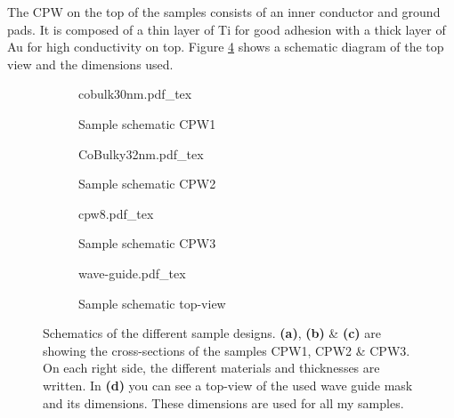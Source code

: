 The CPW on the top of the samples consists of an inner conductor and ground pads. It is composed of a thin layer of Ti for good adhesion with a thick layer of Au for high conductivity on top. Figure \ref{fig:sample_wg} shows a schematic diagram of the top view and the dimensions used.
\begin{figure}
     \centering
     \begin{subfigure}[b]{.45\textwidth}
         \centering
         {cobulk30nm.pdf_tex}
         \caption{Sample schematic CPW1}
         \label{fig:sample_cobulk30nm}
     \end{subfigure}
     \begin{subfigure}[b]{.45\textwidth}
         \centering
         {CoBulky32nm.pdf_tex}
         \caption{Sample schematic CPW2}
         \label{fig:sample_cobulky32nm}
     \end{subfigure}
     \begin{subfigure}[b]{.45\textwidth}
         \centering
         {cpw8.pdf_tex}
         \caption{Sample schematic CPW3}
         \label{fig:sample_cpw456}
     \end{subfigure}
     \begin{subfigure}[b]{.45\textwidth}
         \centering
         {wave-guide.pdf_tex}
         \caption{Sample schematic top-view}
         \label{fig:sample_wg}
     \end{subfigure}
        \caption[Schematics of the sample designs]{Schematics of the different sample designs. \textbf{(a)}, \textbf{(b)} \& \textbf{(c)} are showing the cross-sections of the samples CPW1, CPW2 \& CPW3. On each right side, the different materials and thicknesses are written. In \textbf{(d)} you can see a top-view of the used wave guide mask and its dimensions. These dimensions are used for all my samples.}
        \label{fig:sample}
\end{figure}

